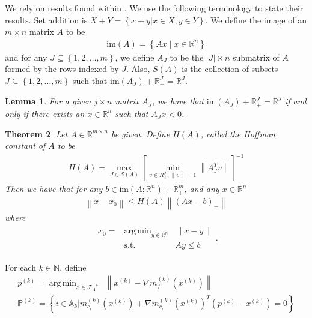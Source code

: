 \documentclass{article}
\newtheorem{theorem}{Theorem}[section]
\newtheorem{lemma}[theorem]{Lemma}
\theoremstyle{case}
\numberwithin{theorem}{subsection}
\DeclareMathOperator*{\argmin}{arg\,min}
\newcommand{\activeconstraintsk}{{\mathbb A_{k}}}
\newcommand{\gk}{{\nabla m_f^{(k)}\left(x^{(k)}\right)}}
\newcommand{\gmcik}{{\nabla m_{c_i}^{(k)}\left(\xk\right)}}
\newcommand{\mcik}{{{m}^{(k)}_{c_i}}}
\newcommand{\naturals}{\mathbb N}
\newcommand{\reals}{\mathbb R}
\newcommand{\Rn}{\mathbb R^n}
\newcommand{\xk}{{x^{(k)}}}
\newcommand{\activefeasiblek}{{\mathcal F^{(k)}_A}}
\newcommand{\projk}{{p^{(k)}}}
\newcommand{\activeprojk}{{\mathbb P^{(k)}}}
\newcommand{\image}{{\textrm{im}}}
\begin{document}
We rely on results found within \cite{pena2020new}.
We use the following terminology to state their results.
Set addition is $X + Y = \left\{x + y | x \in X, y \in Y\right\}$.
We define the image of an $m\times n$ matrix $A$ to be
\begin{align*}
\image(A) = \left\{Ax \;|\; x \in \Rn \right\}
\end{align*}
and for any $J \subseteq \left\{1, 2, \ldots, m \right\}$, we define $A_J$ to be the $|J| \times n$ submatrix of $A$ 
formed by the rows indexed by $J$.
Also, $S(A)$ is the collection of subsets $J \subseteq \left\{1, 2, \ldots, m \right\}$ such that 
$\image(A_J) + \reals_+^J = \reals^J$.

\begin{lemma}
For a given $j \times n$ matrix $A_J$, we have that 
$\image(A_J) + \reals_+^J = \reals^J$
if and only if there exists an $x \in \Rn$ such that
$A_J x < 0$.
\end{lemma}

\begin{theorem}
\label{hoffman_theorem}
Let $A \in \mathbb R^{m \times n}$ be given.
Define $H(A)$, called the Hoffman constant of $A$ to be
\begin{align*}
H(A) = \max_{J \in \mathcal S(A)} \left[\min_{v \in R^J_+, \|v\| = 1}  \left\|A_J^Tv\right\| \right]^{-1}
\end{align*}
Then we have that for any $b \in \image(A; \Rn) + \reals^m_+$, and any $x \in \Rn$
\begin{align*}
\left\|x - x_0\right\| \le H(A) \left\|\left(Ax - b\right)_+\right\|
\end{align*}
where
\begin{align*}
\begin{array}{ccc}
x_0 = & \argmin_{y \in \Rn} & \|x - y\| \\
      & \textrm{s.t.}    & Ay \le b
\end{array}.
\end{align*}
\end{theorem}


For each $k \in \naturals$, define
\begin{align}
\projk = \argmin_{x \in \activefeasiblek} \left\|\xk - \gk\right\| \label{define_projectionk} \\
\activeprojk = \left\{ i \in \activeconstraintsk \bigg| \mcik\left(\xk\right) + \gmcik^T \left(\projk - \xk\right) = 0 \right\} \label{define_active_projection_indices}
\end{align}
\end{document}
